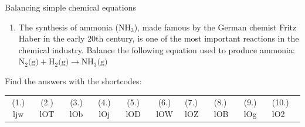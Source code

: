 \begin{exercises}{ Balancing simple chemical equations
        }
\begin{enumerate}[noitemsep, label=\textbf{\arabic*}. ]
\item The synthesis of ammonia ($\text{NH}_{3}$), made famous by the German chemist Fritz Haber in the early 20th century, is one of the most important reactions in the chemical industry. Balance the following equation used to produce ammonia:
$\text{N}_{2} \text{(g)} + \text{H}_{2} \text{(g)} \to \text{NH}_{3} \text{(g)}$
\end{enumerate}
  \label{m38726**end}
\par {} Find the answers with the shortcodes:
 \par \begin{tabular}[h]{cccccc}
 (1.) ljw  &  (2.) lOT   &  (3.) lOb  &  (4.) lOj  &  (5.) lOD  &  (6.) lOW  &  (7.) lOZ  &  (8.) lOB  &  (9.) lOg  &  (10.) lO2  & \end{tabular}
\end{exercises}
